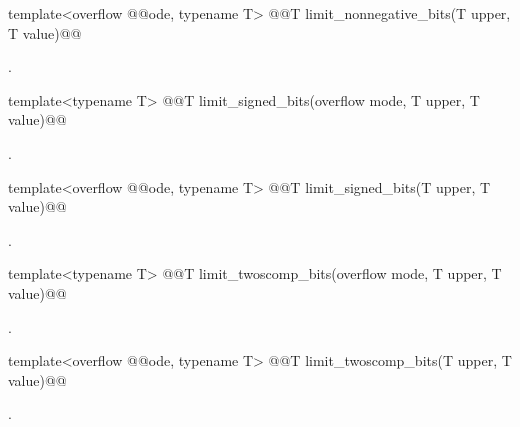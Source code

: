 \begin{addedblock}
\begin{itemdecl}
template<overflow @@ode, typename T> @@T limit_nonnegative_bits(T upper, T value)@\addmodif{;}@
\end{itemdecl}

\begin{itemdescr}
\returns {}.	
\end{itemdescr}

\begin{itemdecl}
template<typename T> @@T limit_signed_bits(overflow mode, T upper, T value)@\addmodif{;}@
\end{itemdecl}

\begin{itemdescr}
\returns {}.	
\end{itemdescr}

\begin{itemdecl}
template<overflow @@ode, typename T> @@T limit_signed_bits(T upper, T value)@\addmodif{;}@
\end{itemdecl}

\begin{itemdescr}
\returns {}.
\end{itemdescr}

\begin{itemdecl}
template<typename T> @@T limit_twoscomp_bits(overflow mode, T upper, T value)@\addmodif{;}@
\end{itemdecl}

\begin{itemdescr}
\returns {}.	
\end{itemdescr}

\begin{itemdecl}
template<overflow @@ode, typename T> @@T limit_twoscomp_bits(T upper, T value)@\addmodif{;}@
\end{itemdecl}

\begin{itemdescr}
\returns {}.	
\end{itemdescr}


\end{addedblock}
